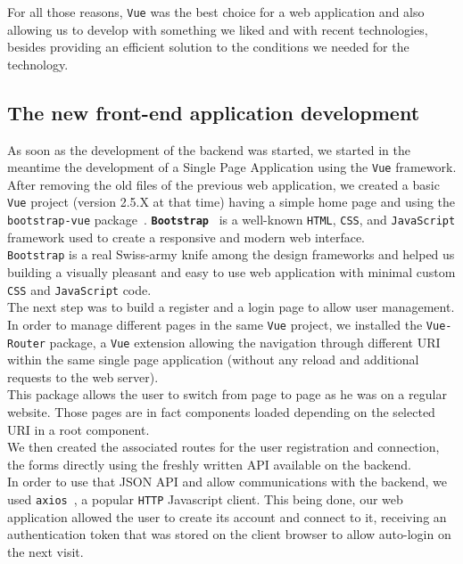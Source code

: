 \documentclass{eplmastersthesis}
\begin{document}
        For all those reasons, \texttt{Vue} was the best choice for a
        web application and also allowing us to develop with something
        we liked and with recent technologies, besides providing an efficient
        solution to the conditions we needed for the technology.

      \subsection{The new front-end application development}

        As soon as the development of the backend was started, we started in the
        meantime the development of a Single Page Application using
        the \texttt{Vue} framework.\\

        After removing the old files of the previous web application, we
        created a basic \texttt{Vue} project (version 2.5.X at that time) having a
        simple home page and using the \texttt{bootstrap-vue} package~\cite{BootstrapVue}.
        \textbf{\texttt{Bootstrap}}~\cite{Bootstrap} is a
        well-known \texttt{HTML}, \texttt{CSS}, and \texttt{JavaScript} framework used to create a responsive
        and modern web interface.\\
        \texttt{Bootstrap} is a real Swiss-army knife among the design frameworks
        and helped us building a visually pleasant and easy to use
        web application with minimal custom \texttt{CSS} and \texttt{JavaScript} code.\\

        The next step was to build a register and a login page to allow
        user management. In order to manage different pages in the same \texttt{Vue}
        project, we installed the \texttt{Vue-Router} package, a \texttt{Vue} extension
        allowing the navigation through different URI within the same
        single page application (without any reload and additional requests
        to the web server).\\
        This package allows the user to switch from page to page
        as he was on a regular website. Those pages are in fact components
        loaded depending on the selected URI in a root component.\\
        We then created the associated routes for the user registration and
        connection, the forms directly using the freshly written API available
        on the backend.\\
        In order to use that JSON API and allow communications with the
        backend, we used \texttt{axios}~\cite{axios}, a popular \texttt{HTTP} Javascript client.
        This being done, our web application allowed the user to create its
        account and connect to it, receiving an authentication token that
        was stored on the client browser to allow auto-login on the next
        visit.\\
\end{document}
